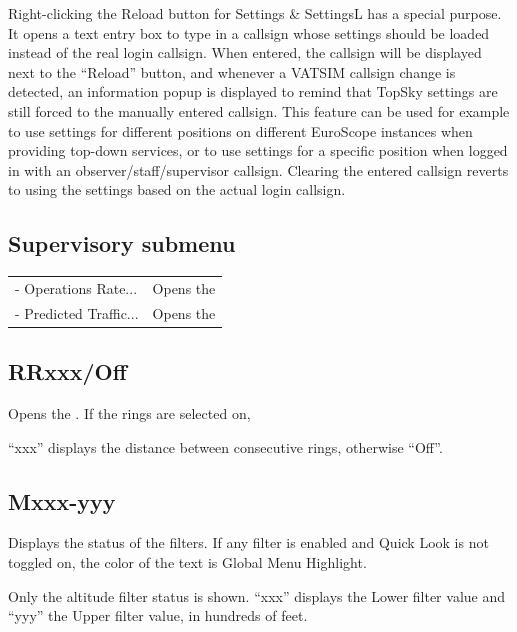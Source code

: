 \documentclass[a4paper,oneside,11pt]{memoir}
\newcommand{\colorref}[1]{\colorbox{Flight Highlight}{\color{#1}#1}}
\newcommand{\winref}[1]{\textit{\titleref{#1}}}
\begin{document}
\bigskip

Right-clicking the Reload button for Settings \& SettingsL has a special purpose. It opens a text entry box to type in a callsign whose settings should be loaded instead of the real login callsign. When entered, the callsign will be displayed next to the “Reload” button, and whenever a VATSIM callsign change is detected, an information popup is displayed to remind that TopSky settings are still forced to the manually entered callsign. This feature can be used for example to use settings for different positions on different EuroScope instances when providing top-down services, or to use settings for a specific position when logged in with an observer/staff/supervisor callsign. Clearing the entered callsign reverts to using the settings based on the actual login callsign.

\subsection*{Supervisory submenu}
\label{menu:super}

\begin{tabular}{l l}
- Operations Rate...     & Opens the \winref{win:orw}\\
- Predicted Traffic... & Opens the \winref{win:ptw}\\
\end{tabular}
\medskip 

\subsection{RRxxx/Off}

Opens the \winref{menu:rr}. If the rings are selected on,

\bigskip

“xxx” displays the distance between consecutive rings, otherwise “Off”.

\subsection{Mxxx-yyy}
\label{menu:mfil}

Displays the status of the filters. If any filter is enabled and Quick Look is not toggled on, the color of the text is \colorref{Global Menu Highlight}.

\bigskip

Only the altitude filter status is shown. “xxx” displays the Lower filter value and “yyy” the Upper filter value, in hundreds of feet.
\end{document}
